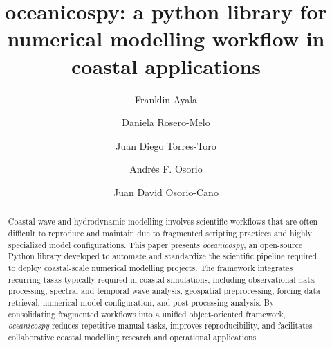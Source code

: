 \documentclass[preprint,12pt, a4paper]{elsarticle}
\begin{document}
\begin{frontmatter}
\title{oceanicospy: a python library for numerical modelling workflow in coastal applications}



\author[label1]{Franklin Ayala}
\author[label1]{Daniela Rosero-Melo}
\author[label1]{Juan Diego Torres-Toro}
\author[label1]{Andrés F. Osorio}
\author[label2]{Juan David Osorio-Cano}

\address[label1]{Universidad Nacional de Colombia, Sede Medellín, Facultad de Minas, Departamento de Geociencias y Medio Ambiente, Grupo de investigación OCEANICOS, Cra 80 No. 65–223, Bloque M2, Medellín, Colombia}
\address[label2]{Universidad Nacional de Colombia, Sede Caribe, Grupo Estudios Ambientales del Caribe, San Andrés, Colombia}

\begin{abstract}


Coastal wave and hydrodynamic modelling involves scientific workflows that are often difficult to reproduce and maintain due to fragmented scripting practices and highly specialized model configurations. This paper presents \textit{oceanicospy}, an open-source Python library developed to automate and standardize the scientific pipeline required to deploy coastal-scale numerical modelling projects. The framework integrates recurring tasks typically required in coastal simulations, including observational data processing, spectral and temporal wave analysis, geospatial preprocessing, forcing data retrieval, numerical model configuration, and post-processing analysis. By consolidating fragmented workflows into a unified object-oriented framework, \textit{oceanicospy} reduces repetitive manual tasks, improves reproducibility, and facilitates collaborative coastal modelling research and operational applications.


\end{abstract}
\end{frontmatter}
\end{document}
